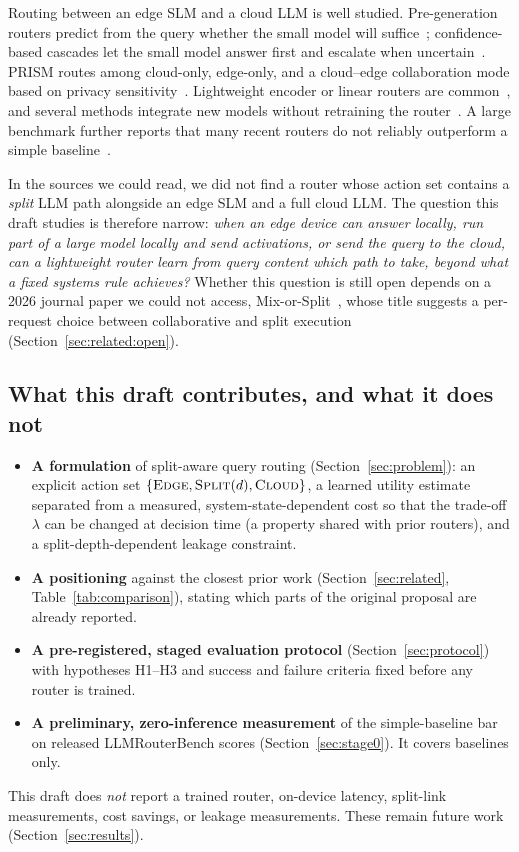 \documentclass[lettersize,journal]{IEEEtran}
\begin{document}
Routing between an edge SLM and a cloud LLM is well studied. Pre-generation
routers predict from the query whether the small model will suffice~\cite{ding2024hybrid,ong2025routellm,qiao2026consroute};
confidence-based cascades let the small model answer first and escalate when
uncertain~\cite{aggarwal2023automix,wu2025recursive,zhu2026dabo,gui2026pro}. PRISM routes
among cloud-only, edge-only, and a cloud--edge collaboration mode based on
privacy sensitivity~\cite{zhan2025prism}. Lightweight encoder or linear routers
are common~\cite{ong2025routellm,chen2024routerdc,garg2026hydra,dey2026compliancegate},
and several methods integrate new models without retraining the
router~\cite{wang2026icl,tran2025arch,shirkavand2025cost,garg2026hydra}. A large
benchmark further reports that many recent routers do not reliably outperform a
simple baseline~\cite{li2026llmrouterbench}.

In the sources we could read, we did not find a router whose action set contains
a \emph{split} LLM path alongside an edge SLM and a full cloud LLM. The question
this draft studies is therefore narrow: \emph{when an edge device can answer
locally, run part of a large model locally and send activations, or send the
query to the cloud, can a lightweight router learn from query content which path
to take, beyond what a fixed systems rule achieves?} Whether this question is
still open depends on a 2026 journal paper we could not access, Mix-or-Split~\cite{wang2026mix},
whose title suggests a per-request choice between collaborative and split
execution (Section~\ref{sec:related:open}).

\subsection*{What this draft contributes, and what it does not}
\begin{itemize}
\item \textbf{A formulation} of split-aware query routing
(Section~\ref{sec:problem}): an explicit action set
$\{\textsc{Edge},\textsc{Split}(d),\textsc{Cloud}\}$, a learned utility estimate
separated from a measured, system-state-dependent cost so that the trade-off
$\lambda$ can be changed at decision time (a property shared with prior
routers), and a split-depth-dependent leakage constraint.
\item \textbf{A positioning} against the closest prior work
(Section~\ref{sec:related}, Table~\ref{tab:comparison}), stating which parts of
the original proposal are already reported.
\item \textbf{A pre-registered, staged evaluation protocol}
(Section~\ref{sec:protocol}) with hypotheses H1--H3 and success and failure
criteria fixed before any router is trained.
\item \textbf{A preliminary, zero-inference measurement} of the simple-baseline
bar on released LLMRouterBench scores (Section~\ref{sec:stage0}). It covers
baselines only.
\end{itemize}
This draft does \emph{not} report a trained router, on-device latency, split-link
measurements, cost savings, or leakage measurements. These remain future work
(Section~\ref{sec:results}).
\end{document}
